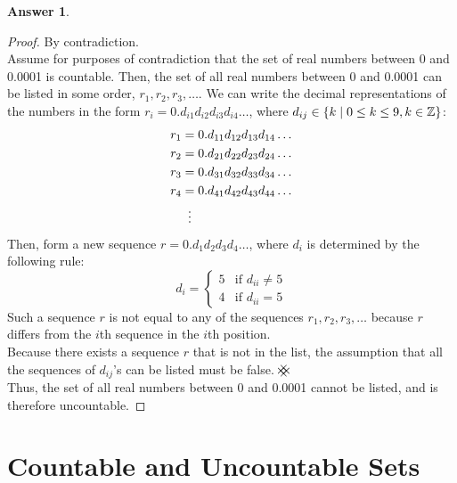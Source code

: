 \documentclass[article, 12pt]{article}
\theoremstyle{definition}
\newtheorem{answer}{Answer}
\DeclarePairedDelimiter\set{\{}{\}}
\newcommand{\ints}{\mathbb{Z}}
\newcommand{\contradiction}{{\hbox{%
    \setbox0=\hbox{$\mkern-3mu\times\mkern-3mu$}%
    \setbox1=\hbox to0pt{\hss$\times$\hss}%
    \copy0\raisebox{0.5\wd0}{\copy1}\raisebox{-0.5\wd0}{\box1}\box0
}}}
\begin{document}
    \begin{answer}
        \begin{proof} By contradiction.
            \\[12pt]
            Assume for purposes of contradiction that the set of real numbers between 0 and 0.0001 is countable. Then, the set of all real numbers between 0 and 0.0001 can be listed in some order, $r_1, r_2, r_3, \dots$. We can write the decimal representations of the numbers in the form $r_i = 0.d_{i1}d_{i2}d_{i3}d_{i4}\dots$, where $d_{ij} \in \set*{k \mid 0 \leq k \leq 9, k \in \ints}$:
            \begin{align*}
                r_1 &= 0.d_{11}d_{12}d_{13}d_{14}\dots \\
                r_2 &= 0.d_{21}d_{22}d_{23}d_{24}\dots \\
                r_3 &= 0.d_{31}d_{32}d_{33}d_{34}\dots \\
                r_4 &= 0.d_{41}d_{42}d_{43}d_{44}\dots \\
                    &\vdotswithin{=}
            \end{align*}
            Then, form a new sequence $r = 0.d_1d_2d_3d_4\dots$, where $d_i$ is determined by the following rule:
            \begin{equation*}
                d_i = \begin{cases}
                    5 & \text{if } d_{ii} \neq 5 \\
                    4 & \text{if } d_{ii} = 5
                \end{cases}
            \end{equation*}
            Such a sequence $r$ is not equal to any of the sequences $r_1, r_2, r_3, \dots$ because $r$ differs from the $i$th sequence in the $i$th position.
            \\[12pt]
            Because there exists a sequence $r$ that is not in the list, the assumption that all the sequences of $d_{ij}$'s can be listed must be false. $\contradiction$
            \\[12pt]
            Thus, the set of all real numbers between 0 and 0.0001 cannot be listed, and is therefore uncountable. 
        \end{proof}
    \end{answer}

    \section{Countable and Uncountable Sets}
    
\end{document}
